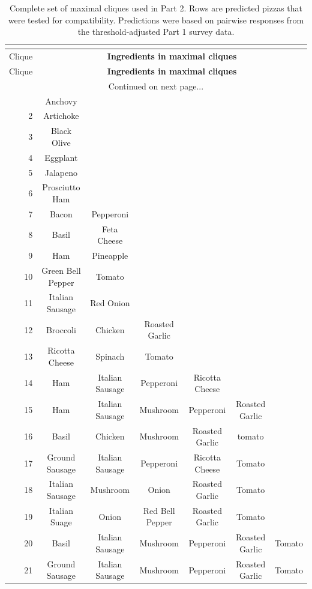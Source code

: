 \begin{landscape}
\footnotesize
\begin{longtable}{rcccccc}
\caption[Complete set of maximal cliques used in Part 2.]{Complete set of maximal cliques used in Part 2. Rows are predicted pizzas that were tested for compatibility. Predictions were based on pairwise responses from the threshold-adjusted Part 1 survey data.} \\
\label{tab:pizzmax} \\
\toprule
Clique & \multicolumn{6}{c}{\bf Ingredients in maximal cliques} \\
\midrule
\endfirsthead
\toprule
Clique & \multicolumn{6}{c}{\bf Ingredients in maximal cliques} \\
\midrule
\endhead
\midrule
 \multicolumn{7}{c}{Continued on next page...} \\
\endfoot
\bottomrule
\endlastfoot
1 & Anchovy & & & & & \\
2 & Artichoke & & & & & \\
3 & Black Olive & &&&& \\
4 & Eggplant & & & & & \\
5 & Jalapeno & & & & & \\
6 & Prosciutto Ham & & & & &\\
7 & Bacon &  Pepperoni & & & &\\
8 & Basil & Feta Cheese &&&&\\
9 & Ham & Pineapple &&&&\\
10 & Green Bell Pepper & Tomato &&&&\\
11 & Italian Sausage & Red Onion &&&&\\
12 & Broccoli & Chicken & Roasted Garlic &&&\\
13 & Ricotta Cheese & Spinach & Tomato &&&\\
14 & Ham & Italian Sausage & Pepperoni & Ricotta Cheese &&\\
15 & Ham & Italian Sausage & Mushroom & Pepperoni & Roasted Garlic &\\
16 & Basil & Chicken & Mushroom & Roasted Garlic &tomato &\\
17 & Ground Sausage & Italian Sausage & Pepperoni & Ricotta Cheese & Tomato &\\
18 & Italian Sausage & Mushroom & Onion & Roasted Garlic & Tomato &\\
19 & Italian Suage & Onion & Red Bell Pepper & Roasted Garlic & Tomato &\\
20 & Basil & Italian Sausage &  Mushroom & Pepperoni & Roasted Garlic & Tomato \\
21 & Ground Sausage & Italian Sausage & Mushroom & Pepperoni & Roasted Garlic & Tomato \\
\end{longtable}
\end{landscape}

